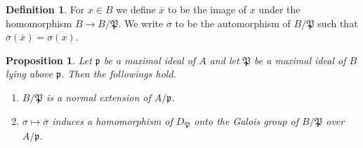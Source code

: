 \documentclass[12pt]{report}
\theoremstyle{plain}
\newtheorem{proposition}[theorem]{Proposition}
\theoremstyle{remark}
\theoremstyle{definition}
\newtheorem{definition}[theorem]{Definition}
\begin{document}
\begin{definition}
    For $x\in B$ we define $\overline{x}$ to be the image of $x$ under the homomorphism $B\to B/\mathfrak{P}$. We write $\overline{\sigma}$ to be the automorphism of $B/\mathfrak{P}$ such that $\overline{\sigma}(\overline{x})=\overline{\sigma(x)}$.
\end{definition}

\begin{proposition}
    Let $\mathfrak{p}$ be a maximal ideal of $A$ and let $\mathfrak{P}$ be a maximal ideal of $B$ lying above $\mathfrak{p}$. Then the followings hold.
    \begin{enumerate}
        \item $B/\mathfrak{P}$ is a normal extension of $A/\mathfrak{p}$.
        \item $\sigma\mapsto\overline{\sigma}$ induces a homomorphism of $D_\mathfrak{P}$ onto the Galois group of $B/\mathfrak{P}$ over $A/\mathfrak{p}$.
    \end{enumerate}
\end{proposition}
\end{document}

